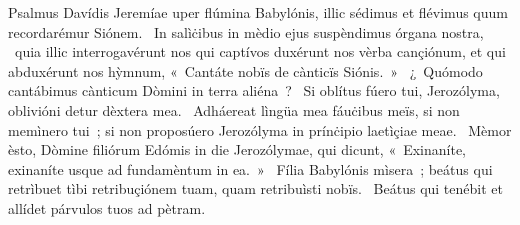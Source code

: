 { Psalmus Davídis Jeremíae}
{%
uper flúmina Babylónis, illic sédimus et flévimus quum recordarémur Siónem. 
~In salìċibus in mèdio ejus suspèndimus órgana nostra, 
~quia illic interrogavérunt nos qui captívos duxérunt nos vèrba cançiónum, et qui abduxérunt nos hỳmnum, «~Cantáte nobïs de cànticïs Siónis.~»
~¿~Quómodo cantábimus cànticum Dòmini in terra aliéna~? 
~Si oblítus fúero tui, Jerozólyma, oblivióni detur dèxtera mea. 
~Adháereat lìngüa mea fáuċibus meïs, si non memìnero tui~; si non proposúero Jerozólyma in prínċipio laetìçiae meae. 
~Mèmor èsto, Dòmine filiórum Edómis in die Jerozólymae, qui dicunt, «~Exinaníte, exinaníte usque ad fundamèntum in ea.~»
~Fília Babylónis mìsera~; beátus qui retrìbuet tìbi retribuçiónem tuam, quam retribuìsti nobïs. 
~Beátus qui tenébit et allídet párvulos tuos ad pètram. 
}
